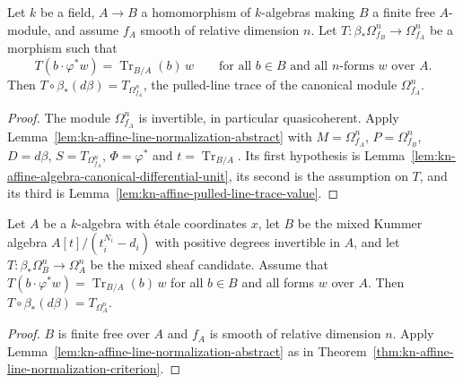 \begin{theorem}
\label{thm:kn-affine-line-normalization-criterion}
\leanok
Let $k$ be a field, $A\to B$ a homomorphism of $k$-algebras making $B$ a finite free
$A$-module, and assume $f_A$ smooth of relative dimension $n$. Let
$T:\beta_*\Omega^n_{f_B}\to\Omega^n_{f_A}$ be a morphism such that
\[
 T(b\cdot\varphi^*w)=\operatorname{Tr}_{B/A}(b)\,w
 \qquad\text{for all } b\in B \text{ and all $n$-forms $w$ over } A.
\]
Then $T\circ\beta_*(d\beta)=T_{\Omega^n_{f_A}}$, the pulled-line trace of the canonical
module $\Omega^n_{f_A}$.
\end{theorem}
\begin{proof}
The module $\Omega^n_{f_A}$ is invertible, in particular quasicoherent. Apply
Lemma~\ref{lem:kn-affine-line-normalization-abstract} with $M=\Omega^n_{f_A}$,
$P=\Omega^n_{f_B}$, $D=d\beta$, $S=T_{\Omega^n_{f_A}}$, $\Phi=\varphi^*$ and
$t=\operatorname{Tr}_{B/A}$. Its first hypothesis is
Lemma~\ref{lem:kn-affine-algebra-canonical-differential-unit}, its second is the assumption on
$T$, and its third is Lemma~\ref{lem:kn-affine-pulled-line-trace-value}.
\end{proof}

\begin{lemma}
\label{lem:kn-affine-line-normalization-mixed-chart}
\leanok
Let $A$ be a $k$-algebra with étale coordinates $x$, let $B$ be the mixed Kummer algebra
$A[t]/(t_i^{N_i}-d_i)$ with positive degrees invertible in $A$, and let
$T:\beta_*\Omega^n_B\to\Omega^n_A$ be the mixed sheaf candidate. Assume that
$T(b\cdot\varphi^*w)=\operatorname{Tr}_{B/A}(b)\,w$ for all $b\in B$ and all forms $w$ over
$A$. Then $T\circ\beta_*(d\beta)=T_{\Omega^n_A}$.
\end{lemma}
\begin{proof}
$B$ is finite free over $A$ and $f_A$ is smooth of relative dimension $n$. Apply
Lemma~\ref{lem:kn-affine-line-normalization-abstract} as in
Theorem~\ref{thm:kn-affine-line-normalization-criterion}.
\end{proof}
